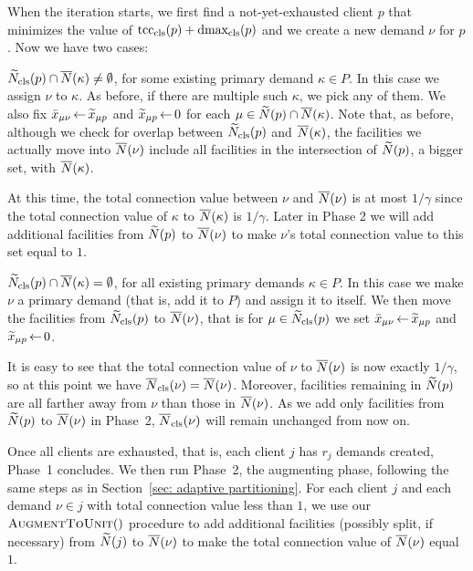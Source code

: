 When the iteration starts, we first find a not-yet-exhausted client
$p$ that minimizes the value of $\mbox{\rm{tcc}}_{\text{cls}}(p) + \mbox{\rm{dmax}}_{\text{cls}}(p)$ and
we create a new demand $\nu$ for $p$.  Now we have two cases:
%
\begin{description}
%
\item{} ${\widetilde N}_{\text{cls}}(p) \cap
  {\overline{N}}(\kappa)\neq\emptyset$, for some existing primary demand
  $\kappa\in P$.  In this case we assign $\nu$ to $\kappa$. As before, if
  there are multiple such $\kappa$, we pick any of them. We also fix
  ${\bar x}_{\mu \nu} {\,\leftarrow\,} {\widetilde x}_{\mu p}$ and ${\widetilde x}_{\mu p}{\,\leftarrow\,} 0$
  for each $\mu \in {\widetilde N}(p)\cap {\overline{N}}(\kappa)$. Note that, as before,
  although we check for overlap between ${\widetilde N}_{\text{cls}}(p)$ and
  ${\overline{N}}(\kappa)$, the facilities we actually move into
  ${\overline{N}}(\nu)$ include all facilities in the intersection of
  ${\widetilde N}(p)$, a bigger set, with ${\overline{N}}(\kappa)$.

  At this time, the total connection value between $\nu$ and ${\overline{N}}(\nu)$ is
  at most $1/\gamma$ since the total connection value of $\kappa$ to
  ${\overline{N}}(\kappa)$ is $1/\gamma$. Later in Phase 2 we will add
  additional facilities from ${\widetilde N}(p)$ to ${\overline{N}}(\nu)$ to make $\nu$'s total connection value to this set
  equal to $1$. 

%
\item{} ${\widetilde N}_{\text{cls}}(p) \cap {\overline{N}}(\kappa) =
  \emptyset$, for all existing primary demands $\kappa\in P$.  In this case
  we make $\nu$ a primary demand (that is, add it to $P$) and assign it to itself. 
  We then move the facilities from ${\widetilde N}_{\text{cls}}(p)$ to ${\overline{N}}(\nu)$, that is
  for $\mu \in {\widetilde N}_{\text{cls}}(p)$
	we set ${\bar x}_{\mu \nu}{\,\leftarrow\,} {\widetilde x}_{\mu p}$  and   ${\widetilde x}_{\mu p}\,{\leftarrow}\, 0$.  

  It is easy to see that the total connection value of $\nu$ to ${\overline{N}}(\nu)$
  is now exactly $1/\gamma$, so at this point we have ${\overline{N}}_{\text{cls}}(\nu) = {\overline{N}}(\nu)$.
Moreover, facilities remaining in
  ${\widetilde N}(p)$ are all farther away from $\nu$ than those in
  ${\overline{N}}(\nu)$. As we add only facilities from ${\widetilde N}(p)$ to ${\overline{N}}(\nu)$
  in Phase~2, ${\overline{N}}_{\text{cls}}(\nu)$ will remain unchanged from now on.
%
\end{description}
%
Once all clients are exhausted, that is, each client $j$ has $r_j$
demands created, Phase~1 concludes. We then run Phase~2, the
augmenting phase, following the same steps as in Section~\ref{sec: adaptive partitioning}.
For each client $j$ and each demand $\nu\in j$ with total connection
value less than $1$, we use our ${\textsc{AugmentToUnit}}()$ procedure to add
additional facilities (possibly split, if necessary) from
${\widetilde N}(j)$ to ${\overline{N}}(\nu)$ to make the total connection value of ${\overline{N}}(\nu)$
equal $1$.  

